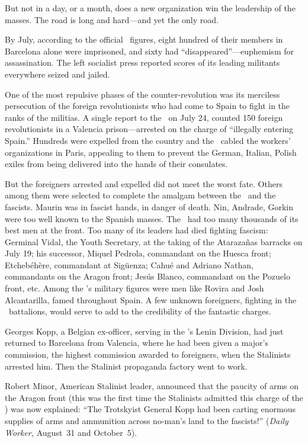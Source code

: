 \medskip

But not in a day, or a month, does a new organization win the leadership of the masses. The road is long and hard---and yet the only road.

\dinkus

By July, according to the official \CNT\ figures, eight hundred of their members in Barcelona alone were imprisoned, and sixty had ``disappeared''---euphemism for assassination. The left socialist press reported scores of its leading militants everywhere seized and jailed.

One of the most repulsive phases of the counter-revolution was its merciless persecution of the foreign revolutionists who had come to Spain to fight in the ranks of the militias. A single report to the \CNT\ on July 24, counted 150 foreign revolutionists in a Valencia prison---arrested on the charge of ``illegally entering Spain.'' Hundreds were expelled from the country and the \CNT\ cabled the workers’ organizations in Paris, appealing to them to prevent the German, Italian, Polish exiles from being delivered into the hands of their consulates.

But the foreigners arrested and expelled did not meet the worst fate. Others among them were selected to complete the amalgam between the \POUM\ and the fascists. Maurin was in fascist hands, in danger of death. Nin, Andrade, Gorkin were too well known to the Spanish masses. The \POUM\ had too many thousands of its best men at the front. Too many of its leaders had died fighting fascism: Germinal Vidal, the Youth Secretary, at the taking of the Atarazañas barracks on July 19; his successor, Miquel Pedrola, commandant on the Huesca front; Etcheb\'eh\`ere, commandant at Sig\"uenza; Cahué and Adriano Nathan, commandants on the Aragon front; Jes\'us Blanco, commandant on the Pozuelo front, etc. Among the \POUM’s military figures were men like Rovira and Josh Alcantarilla, famed throughout Spain. A few unknown foreigners, fighting in the \POUM\ battalions, would serve to add to the credibility of the fantastic charges.

Georges Kopp, a Belgian ex-officer, serving in the \POUM’s Lenin Division, had just returned to Barcelona from Valencia, where he had been given a major’s commission, the highest commission awarded to foreigners, when the Stalinists arrested him.
Then the Stalinist propaganda factory went to work.

Robert Minor, American Stalinist leader, announced that the pau\-ci\-ty of arms on the Aragon front (this was the first time the Stalinists admitted this charge of the \CNT) was now explained: ``The Trotskyist General Kopp had been carting enormous supplies of arms and ammunition across no-man’s land to the fascists!'' (\emph{Daily Worker,} August~31 and October~5).

